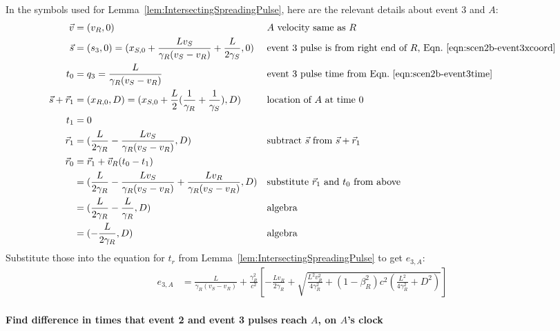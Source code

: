 \documentclass[a4paper]{article}
\theoremstyle{plain}
\theoremstyle{definition}
\newcommand{\vect}[1]{\vec{#1}}
\begin{document}
In the symbols used for Lemma~\ref{lem:IntersectingSpreadingPulse},
here are the relevant details about event 3 and $A$:
\begin{align*}
\vect{v} & = (v_R, 0) & & \text{$A$ velocity same as $R$} \\
\vect{s} & = (s_3,0) = (x_{S,0} + \frac{Lv_S}{\gamma_R(v_S - v_R)} + \frac{L}{2\gamma_S}, 0) & & \text{event 3 pulse is from right end of $R$, Eqn.~\eqref{eqn:scen2b-event3xcoord}} \\
t_0 & = q_3 = \frac{L}{\gamma_R(v_S - v_R)} & & \text{event 3 pulse time from Eqn.~\eqref{eqn:scen2b-event3time}} \\
\vect{s} + \vect{r}_1 & = (x_{R,0}, D) = (x_{S,0} + \frac{L}{2} ( \frac{1}{\gamma_R} + \frac{1}{\gamma_S} ), D) & & \text{location of $A$ at time 0} \\
t_1 & = 0 \\
\vect{r}_1 & = (\frac{L}{2\gamma_R} - \frac{Lv_S}{\gamma_R(v_S - v_R)}, D) & & \text{subtract $\vect{s}$ from $\vect{s}+\vect{r}_1$} \\
\vect{r}_0
  & = \vect{r}_1 + \vect{v}_R(t_0-t_1) \\
  & = (\frac{L}{2\gamma_R} - \frac{Lv_S}{\gamma_R(v_S - v_R)} + \frac{Lv_R}{\gamma_R(v_S - v_R)}, D) & & \text{substitute $\vect{r}_1$ and $t_0$ from above} \\
  & = (\frac{L}{2\gamma_R} - \frac{L}{\gamma_R}, D) & & \text{algebra} \\
  & = (-\frac{L}{2\gamma_R}, D) & & \text{algebra}
\end{align*}
Substitute those into the equation for $t_r$ from
Lemma~\ref{lem:IntersectingSpreadingPulse} to get $e_{3,A}$:
\begin{align*}
e_{3,A} & = \frac{L}{\gamma_R(v_S - v_R)} + \frac{\gamma_R^2}{c^2} \left[ -\frac{Lv_R}{2\gamma_R} + \sqrt{\frac{L^2v_R^2}{4\gamma_R^2} + (1-\beta_R^2)c^2 (\frac{L^2}{4\gamma_R^2} + D^2)} \right]
\end{align*}


\paragraph{Find difference in times that event 2 and event 3 pulses reach $A$, on $A$'s clock}
\end{document}
